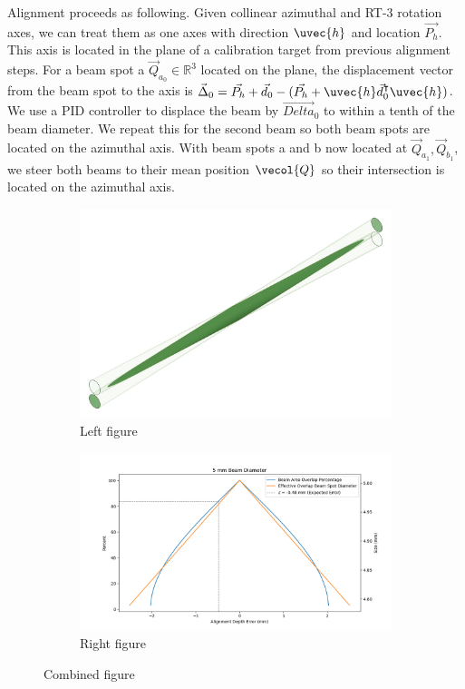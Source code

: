Alignment proceeds as following. Given collinear azimuthal and RT-3 rotation axes, we can treat them as one axes with direction $\uvec{h}$ and location $\vec{P_h}$. This axis is located in the plane of a calibration target from previous alignment steps. For a beam spot a $\vec{Q}_{a_0} \in \mathbb{R}^3$ located on the plane, the displacement vector from the beam spot to the axis is $\vec{\Delta}_0 = \vec{P_h} + \vec{d}_0 - (\vec{P_h} + \uvec{h} \vec{d}_0^\intercal \uvec{h})$. We use a PID controller to displace the beam by $\vec{Delta}_0$ to within a tenth of the beam diameter. We repeat this for the second beam so both beam spots are located on the azimuthal axis. With beam spots a and b now located at $\vec{Q}_{a_1}, \vec{Q}_{b_1}$, we steer both beams to their mean position $\vecol{Q}$ so their intersection is located on the azimuthal axis.

\begin{figure}
    \centering
    \begin{subfigure}{0.49\textwidth}
        \centering
        \includegraphics[width = \textwidth]{figures/beam_intersection_nooutline.png}
        \caption{Left figure}
        \label{fig:left}
    \end{subfigure}
    \begin{subfigure}{0.49\textwidth}
        \centering
        \includegraphics[width = \textwidth]{figures/BeamAlignmentMargin.png}
        \caption{Right figure}
        \label{fig:right}
    \end{subfigure}
    \caption{Combined figure}
    \label{fig:beam_intersection_margin}
\end{figure}

